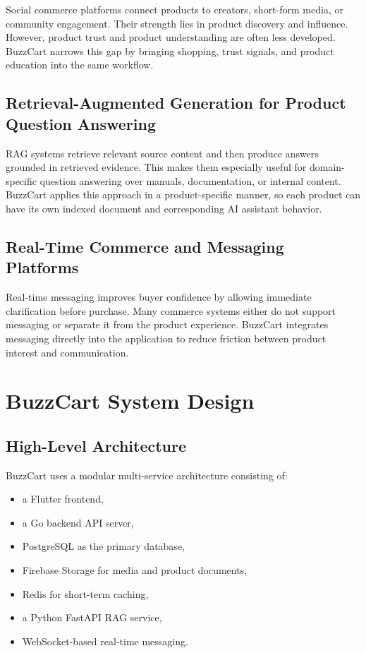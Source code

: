 \documentclass[12pt,letterpaper]{report}
\begin{document}
Social commerce platforms connect products to creators, short-form media, or community engagement. Their strength lies in product discovery and influence. However, product trust and product understanding are often less developed. BuzzCart narrows this gap by bringing shopping, trust signals, and product education into the same workflow.

\section{Retrieval-Augmented Generation for Product Question Answering}

RAG systems retrieve relevant source content and then produce answers grounded in retrieved evidence. This makes them especially useful for domain-specific question answering over manuals, documentation, or internal content. BuzzCart applies this approach in a product-specific manner, so each product can have its own indexed document and corresponding AI assistant behavior.

\section{Real-Time Commerce and Messaging Platforms}

Real-time messaging improves buyer confidence by allowing immediate clarification before purchase. Many commerce systems either do not support messaging or separate it from the product experience. BuzzCart integrates messaging directly into the application to reduce friction between product interest and communication.

\chapter{BuzzCart System Design}

\section{High-Level Architecture}

BuzzCart uses a modular multi-service architecture consisting of:

\begin{itemize}
  \item a Flutter frontend,
  \item a Go backend API server,
  \item PostgreSQL as the primary database,
  \item Firebase Storage for media and product documents,
  \item Redis for short-term caching,
  \item a Python FastAPI RAG service,
  \item WebSocket-based real-time messaging.
\end{itemize}
\end{document}
